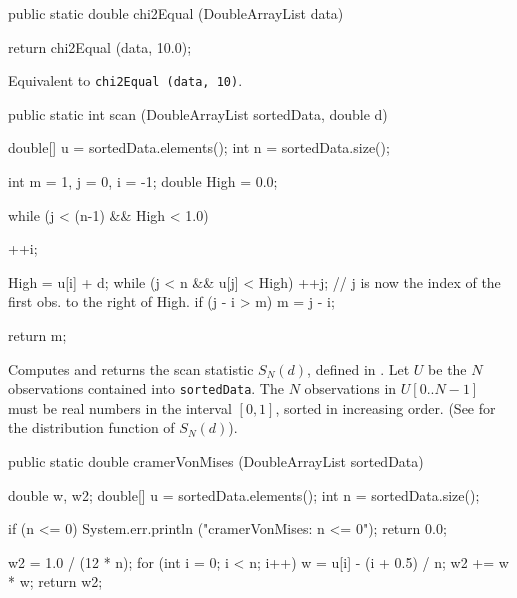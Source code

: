 \begin{code}

   public static double chi2Equal (DoubleArrayList data)\begin{hide} {
   return chi2Equal (data, 10.0);
}\end{hide}
\end{code}
\begin{tabb} Equivalent to \texttt{chi2Equal (data, 10)}.
\end{tabb}
\begin{htmlonly}
   \param{data}{array of observations in $[0,1)$}
\end{htmlonly}
\begin{code}

   public static int scan (DoubleArrayList sortedData, double d)\begin{hide} {

      double[] u = sortedData.elements();
      int n = sortedData.size();

      int m = 1, j = 0, i = -1;
      double High = 0.0;

      while (j < (n-1) && High < 1.0) {
         ++i;

         High = u[i] + d;
         while (j < n && u[j] < High)
            ++j;
         // j is now the index of the first obs. to the right of High.
         if (j - i > m)
            m = j - i;
      }
      return m;
   }\end{hide}
\end{code}
 \begin{tabb} Computes and returns the scan statistic $S_N (d)$,
  defined in \latex{(\ref{eq:scan})}.
  Let $U$ be the $N$ observations contained into \texttt{sortedData}.
  The $N$ observations in $U[0..N-1]$ must be real numbers
  in the interval $[0,1]$, sorted in increasing order.
  (See  for the distribution function of $S_N (d)$).
 \end{tabb}
\begin{htmlonly}
\end{htmlonly}
\begin{code}

   public static double cramerVonMises (DoubleArrayList sortedData)\begin{hide} {
      double w, w2;
      double[] u = sortedData.elements();
      int n = sortedData.size();

      if (n <= 0) {
         System.err.println ("cramerVonMises:  n <= 0");
         return 0.0;
      }

      w2 = 1.0 / (12 * n);
      for (int i = 0; i < n; i++) {
         w = u[i] - (i + 0.5) / n;
         w2 += w * w;
      }
      return w2;
   }\end{hide}
\end{code}
